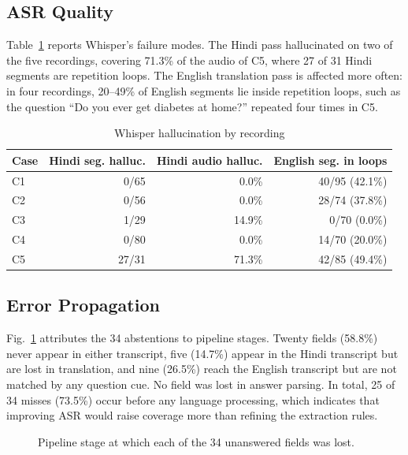 \documentclass[conference]{IEEEtran}
\begin{document}
\subsection{ASR Quality}
Table~\ref{tab:asr} reports Whisper's failure modes. The Hindi pass hallucinated on two of the five recordings, covering 71.3\% of the audio of C5, where 27 of 31 Hindi segments are repetition loops. The English translation pass is affected more often: in four recordings, 20–49\% of English segments lie inside repetition loops, such as the question “Do you ever get diabetes at home?” repeated four times in C5.

\begin{table}[!t]
\centering\footnotesize
\caption{Whisper hallucination by recording}\label{tab:asr}
\begin{tabular}{lrrr}
\toprule
\textbf{Case} & \textbf{Hindi seg. halluc.} & \textbf{Hindi audio halluc.} & \textbf{English seg. in loops} \\
\midrule
C1 & 0/65 & 0.0\% & 40/95 (42.1\%) \\
C2 & 0/56 & 0.0\% & 28/74 (37.8\%) \\
C3 & 1/29 & 14.9\% & 0/70 (0.0\%) \\
C4 & 0/80 & 0.0\% & 14/70 (20.0\%) \\
C5 & 27/31 & 71.3\% & 42/85 (49.4\%) \\
\bottomrule
\end{tabular}
\end{table}

\subsection{Error Propagation}
Fig.~\ref{fig:err} attributes the 34 abstentions to pipeline stages. Twenty fields (58.8\%) never appear in either transcript, five (14.7\%) appear in the Hindi transcript but are lost in translation, and nine (26.5\%) reach the English transcript but are not matched by any question cue. No field was lost in answer parsing. In total, 25 of 34 misses (73.5\%) occur before any language processing, which indicates that improving ASR would raise coverage more than refining the extraction rules.

\begin{figure}[!t]
\centering
{}
\caption{Pipeline stage at which each of the 34 unanswered fields was lost.}\label{fig:err}
\end{figure}
\end{document}
